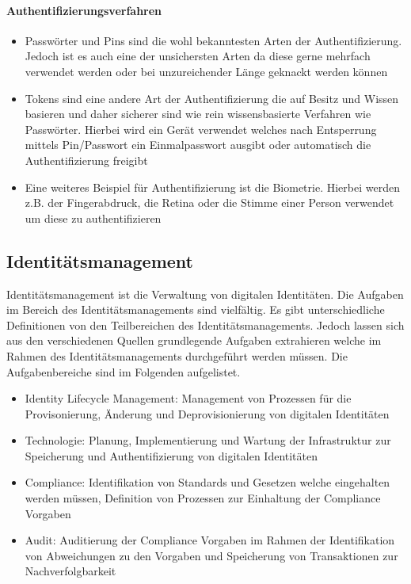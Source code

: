 \documentclass[12pt]{article}
\begin{document}
\paragraph{Authentifizierungsverfahren}
\begin{itemize}
  \item Passwörter und Pins sind die wohl bekanntesten Arten der Authentifizierung. Jedoch ist es auch eine der unsichersten Arten da diese gerne mehrfach verwendet werden oder bei unzureichender Länge geknackt werden können~\cite{tsolkas2017}
  \item Tokens sind eine andere Art der Authentifizierung die auf Besitz und Wissen basieren und daher sicherer sind wie rein wissensbasierte Verfahren wie Passwörter. Hierbei wird ein Gerät verwendet welches nach Entsperrung mittels Pin/Passwort ein Einmalpasswort ausgibt oder automatisch die Authentifizierung freigibt~\cite{tsolkas2017}
  \item Eine weiteres Beispiel für Authentifizierung ist die Biometrie. Hierbei werden z.B. der Fingerabdruck, die Retina oder die Stimme einer Person verwendet um diese zu authentifizieren~\cite{tsolkas2017}
\end{itemize}
\subsection{Identitätsmanagement}
Identitätsmanagement ist die Verwaltung von digitalen Identitäten. Die Aufgaben im Bereich des Identitätsmanagements sind vielfältig. Es gibt unterschiedliche Definitionen von den Teilbereichen des Identitätsmanagements. Jedoch lassen sich aus den verschiedenen Quellen grundlegende Aufgaben extrahieren welche im Rahmen des Identitätsmanagements durchgeführt werden müssen. Die Aufgabenbereiche sind im Folgenden aufgelistet.
\begin{itemize}
  \item Identity Lifecycle Management: Management von Prozessen für die Provisonierung, Änderung und Deprovisionierung von digitalen Identitäten~\cite{bertino2010identity}
  \item Technologie: Planung, Implementierung und Wartung der Infrastruktur zur Speicherung und Authentifizierung von digitalen Identitäten~\cite{bertino2010identity}
  \item Compliance: Identifikation von Standards und Gesetzen welche eingehalten werden müssen, Definition von Prozessen zur Einhaltung der Compliance Vorgaben~\cite{conta2017leitfaden}\cite{tsolkas2017}
  \item Audit: Auditierung der Compliance Vorgaben im Rahmen der Identifikation von Abweichungen zu den Vorgaben und Speicherung von Transaktionen zur Nachverfolgbarkeit~\cite{peyton2007audit}\cite{accorsi2008automated}\cite{bertino2010identity}
\end{itemize}
\end{document}
